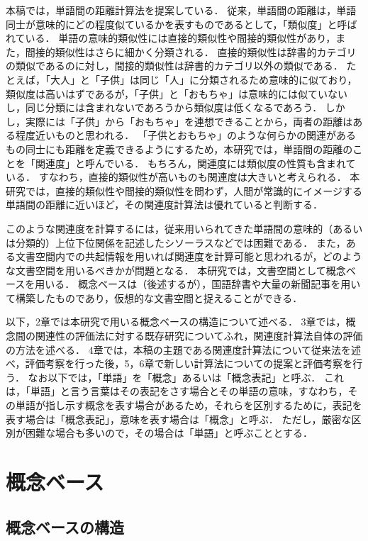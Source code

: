 本稿では，単語間の距離計算法を提案している．
従来，単語間の距離は，単語同士が意味的にどの程度似ているかを表すものであるとして，「類似度」と呼ばれている．
単語の意味的類似性には直接的類似性や間接的類似性があり，また，間接的類似性はさらに細かく分類される\cite{Utsumi}．
直接的類似性は辞書的カテゴリの類似であるのに対し，間接的類似性は辞書的カテゴリ以外の類似である．
たとえば，「大人」と「子供」は同じ「人」に分類されるため意味的に似ており，類似度は高いはずであるが，「子供」と「おもちゃ」は意味的には似ていないし，同じ分類には含まれないであろうから類似度は低くなるであろう．
しかし，実際には「子供」から「おもちゃ」を連想できることから，両者の距離はある程度近いものと思われる．
「子供とおもちゃ」のような何らかの関連があるもの同士にも距離を定義できるようにするため，本研究では，単語間の距離のことを「関連度」と呼んでいる．
もちろん，関連度には類似度の性質も含まれている．
すなわち，直接的類似性が高いものも関連度は大きいと考えられる．
本研究では，直接的類似性や間接的類似性を問わず，人間が常識的にイメージする単語間の距離に近いほど，その関連度計算法は優れていると判断する．

このような関連度を計算するには，従来用いられてきた単語間の意味的（あるいは分類的）上位下位関係を記述したシソーラス\cite{NTT}などでは困難である．
また，ある文書空間内での共起情報を用いれば関連度を計算可能と思われるが，どのような文書空間を用いるべきかが問題となる．
本研究では，文書空間として概念ベースを用いる．
概念ベースは（後述するが），国語辞書や大量の新聞記事を用いて構築したものであり，仮想的な文書空間と捉えることができる．

以下，2章では本研究で用いる概念ベースの構造について述べる．
3章では，概念間の関連性の評価法に対する既存研究についてふれ，関連度計算法自体の評価の方法を述べる．
4章では，本稿の主題である関連度計算法について従来法を述べ，評価考察を行った後，5，6章で新しい計算法についての提案と評価考察を行う．
なお以下では，「単語」を「概念」あるいは「概念表記」と呼ぶ．
これは，「単語」と言う言葉はその表記をさす場合とその単語の意味，すなわち，その単語が指し示す概念を表す場合があるため，それらを区別するために，表記を表す場合は「概念表記」，意味を表す場合は「概念」と呼ぶ．
ただし，厳密な区別が困難な場合も多いので，その場合は「単語」と呼ぶこととする．

\section{概念ベース}\label{BasicCB}

\subsection{概念ベースの構造}

